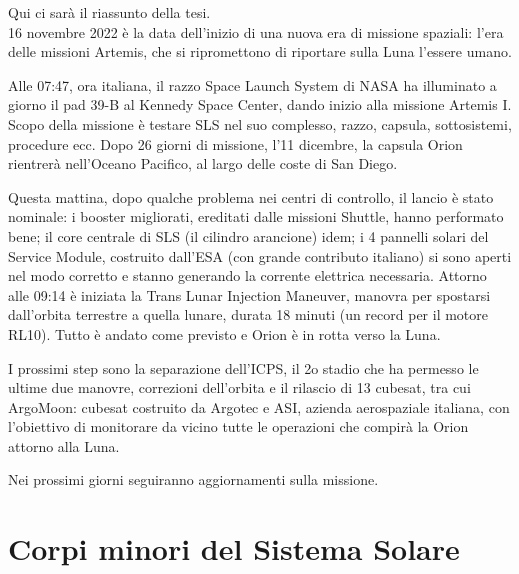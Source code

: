 \documentclass[a4paper,11pt,openright]{book}
\newenvironment{abstract}%
{\cleardoublepage%
\thispagestyle{empty}%
\null \vfill
\begin{center}%
\Huge \bfseries \abstractname 
\end{center}}%
{\vfill\null}
\begin{document}
\begin{abstract}    
Qui ci sarà il riassunto della tesi.\\
16 novembre 2022 è la data dell’inizio di una nuova era di missione spaziali: l’era delle missioni Artemis, che si ripromettono di riportare sulla Luna l’essere umano.

Alle 07:47, ora italiana, il razzo Space Launch System di NASA ha illuminato a giorno il pad 39-B al Kennedy Space Center, dando inizio alla missione Artemis I.
Scopo della missione è testare SLS nel suo complesso, razzo, capsula, sottosistemi, procedure ecc. 
Dopo 26 giorni di missione, l’11 dicembre, la capsula Orion rientrerà nell'Oceano Pacifico, al largo delle coste di San Diego.

Questa mattina, dopo qualche problema nei centri di controllo, il lancio è stato nominale: i booster migliorati, ereditati dalle missioni Shuttle, hanno performato bene; il core centrale di SLS (il cilindro arancione) idem; i 4 pannelli solari del Service Module, costruito dall’ESA (con grande contributo italiano) si sono aperti nel modo corretto e stanno generando la corrente elettrica necessaria.
Attorno alle 09:14 è iniziata la Trans Lunar Injection Maneuver, manovra per spostarsi dall'orbita terrestre a quella lunare, durata 18 minuti (un record per il motore RL10). Tutto è andato come previsto e Orion è in rotta verso la Luna.

I prossimi step sono la separazione dell'ICPS, il 2o stadio che ha permesso le ultime due manovre, correzioni dell’orbita e il rilascio di 13 cubesat, tra cui ArgoMoon: cubesat costruito da Argotec e ASI, azienda aerospaziale italiana, con l’obiettivo di monitorare da vicino tutte le operazioni che compirà la Orion attorno alla Luna.

Nei prossimi giorni seguiranno aggiornamenti sulla missione.
\end{abstract}



\tableofcontents

\listoftables

\listoffigures


\mainmatter

\chapter{Corpi minori del Sistema Solare}\label{ch:ch_1}

\end{document}

